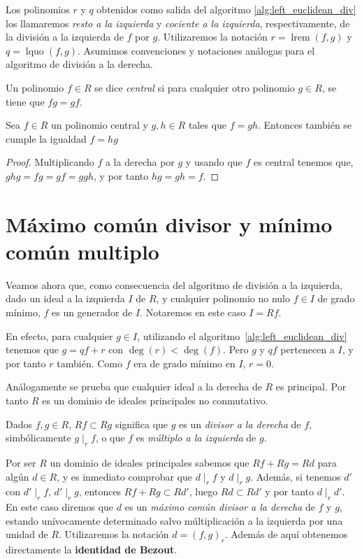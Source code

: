 Los polinomios \(r\) y \(q\) obtenidos como salida del algoritmo \ref{alg:left_euclidean_div} los llamaremos \textit{resto a la izquierda} y  \textit{cociente a la izquierda}, respectivamente, de la división a la izquierda de \(f\) por \(g\). Utilizaremos la notación \(r = \operatorname{lrem}(f,g)\) y \(q = \operatorname{lquo}(f,g)\). Asumimos convenciones y notaciones análogas para el algoritmo de división a la derecha.

Un polinomio \(f \in R\) se dice \textit{central} si para cualquier otro polinomio \(g \in R\), se tiene que \(fg = gf\).

\begin{lemma}
\label{lem:central_decomposition}
    Sea \(f \in R\) un polinomio central y \(g,h \in R\) tales que \(f = gh\). Entonces también se cumple la igualdad \(f = hg\)
\end{lemma}

\begin{proof}
    Multiplicando \(f\) a la derecha por \(g\) y usando que \(f\) es central tenemos que, \( ghg = fg = gf = ggh\), y por tanto \(hg = gh = f.\)
\end{proof}

\section{Máximo común divisor y mínimo común multiplo}%
\label{sec:máximo_común_divisor_y_mínimo_común_multiplo}

Veamos ahora que, como consecuencia del algoritmo de división a la izquierda, dado un ideal a la izquierda \(I\) de \(R\), y cualquier polinomio no nulo  \(f \in I\) de grado mínimo, \(f\) es un generador de  \(I\). Notaremos en este caso \(I = Rf\).

En efecto, para cualquier \(g \in I\), utilizando el algoritmo~\ref{alg:left_euclidean_div} tenemos que \(g = qf + r\) con \(\deg(r) < \deg(f)\). Pero \(g\) y \(qf\) pertenecen a \(I\), y por tanto  \(r\) también. Como \(f\) era de grado mínimo en \(I\),  \(r = 0\).

Análogamente se prueba que cualquier ideal a la derecha de \(R\) es principal.  Por tanto \(R\) es un dominio de ideales principales no conmutativo.

Dados \(f,g \in R\), \(Rf \subset Rg\) significa que \(g\) es un \textit{divisor a la derecha} de \(f\), simbólicamente \(g \mid_{r} f\), o que \(f\) es \textit{múltiplo a la izquierda} de \(g\).

Por ser \(R\) un dominio de ideales principales sabemos que \(Rf + Rg = Rd\) para algún \(d \in R\), y es inmediato comprobar que \(d \mid_r f\) y  \(d  \mid_r g\). Además, si tenemos \(d'\) con \(d'  \mid_r f\), \(d'  \mid_r g\), entonces \(Rf + Rg \subset Rd'\), luego \(Rd \subset Rd'\) y por tanto  \(d  \mid_r d'\). En este caso diremos que \(d\) es un \textit{máximo común divisor a la derecha} de \(f\) y \(g\), estando unívocamente determinado salvo múltiplicación a la izquierda por una unidad de \(R\). Utilizaremos la notación \(d = {(f,g)}_r\). Además de aquí obtenemos directamente la \textbf{identidad de Bezout}.

